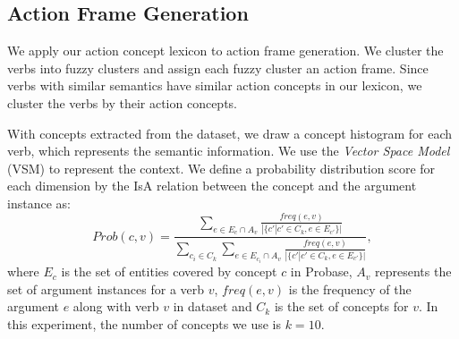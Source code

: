 \subsection{Action Frame Generation}
We apply our action concept lexicon to action frame generation.
We cluster the verbs into fuzzy clusters and assign each fuzzy cluster
an action frame.
Since verbs with similar semantics have similar action concepts in our lexicon,
we cluster the verbs by their action concepts.

With concepts extracted from the dataset, we draw a concept histogram for
each verb, which represents the semantic information.
We use the \emph{Vector Space Model} (VSM) to represent the context.
We define a probability distribution score for each dimension
by the IsA relation between the concept and the argument instance as:
$$
Prob(c,v)=\frac{\sum_{e\in E_c\cap A_v}{\frac{freq(e,v)}{|\{c'|c'\in C_k,
e\in E_{c'}\}|}}}{\sum_{c_i\in C_k}{\sum_{e\in E_{c_i}\cap A_v}{\frac{freq(e,v)}{|\{c'|c'\in C_k, e\in E_{c'}\}|}}}},
$$
where $E_c$ is the set of entities covered by concept $c$ in Probase, $A_v$ represents the set of argument instances
for a verb $v$, $freq(e,v)$ is the frequency of the argument $e$ along with verb $v$ in dataset and $C_k$ is the set of concepts for $v$.
In this experiment, the number of concepts we use is $k=10$.

